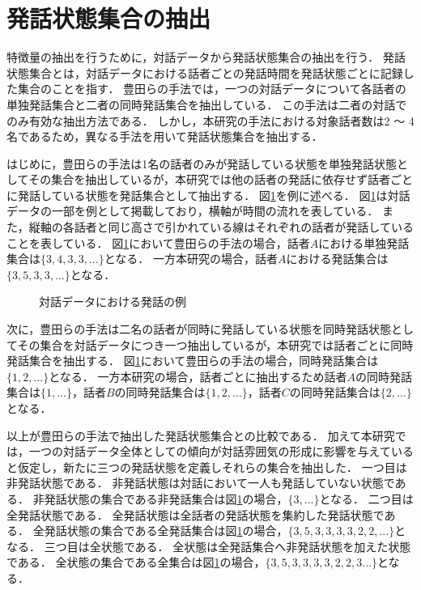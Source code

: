 \section{発話状態集合の抽出}

特徴量の抽出を行うために，対話データから発話状態集合の抽出を行う．
発話状態集合とは，対話データにおける話者ごとの発話時間を発話状態ごとに記録した集合のことを指す．
豊田らの手法では，一つの対話データについて各話者の単独発話集合と二者の同時発話集合を抽出している．
この手法は二者の対話でのみ有効な抽出方法である．
しかし，本研究の手法における対象話者数は2 〜 4名であるため，異なる手法を用いて発話状態集合を抽出する．

はじめに，豊田らの手法は1名の話者のみが発話している状態を単独発話状態としてその集合を抽出しているが，本研究では他の話者の発話に依存せず話者ごとに発話している状態を発話集合として抽出する．
図\ref{fig:speaker_split}を例に述べる．
図\ref{fig:speaker_split}は対話データの一部を例として掲載しており，横軸が時間の流れを表している．
また，縦軸の各話者と同じ高さで引かれている線はそれぞれの話者が発話していることを表している．
図\ref{fig:speaker_split}において豊田らの手法の場合，話者$A$における単独発話集合は$\{3, 4, 3, 3, ...\}$となる．
一方本研究の場合，話者$A$における発話集合は$\{3, 5, 3, 3, ...\}$となる．

\begin{figure}
    \centering
    \caption{対話データにおける発話の例}
    \label{fig:speaker_split}
\end{figure}

次に，豊田らの手法は二名の話者が同時に発話している状態を同時発話状態としてその集合を対話データにつき一つ抽出しているが，本研究では話者ごとに同時発話集合を抽出する．
図\ref{fig:speaker_split}において豊田らの手法の場合，同時発話集合は$\{1, 2, ...\}$となる．
一方本研究の場合，話者ごとに抽出するため話者$A$の同時発話集合は$\{1, ...\}$，話者$B$の同時発話集合は$\{1, 2, ...\}$，話者$C$の同時発話集合は$\{2, ...\}$となる．

以上が豊田らの手法で抽出した発話状態集合との比較である．
加えて本研究では，一つの対話データ全体としての傾向が対話雰囲気の形成に影響を与えていると仮定し，新たに三つの発話状態を定義しそれらの集合を抽出した．
一つ目は非発話状態である．
非発話状態は対話において一人も発話していない状態である．
非発話状態の集合である非発話集合は図\ref{fig:speaker_split}の場合，$\{3, ...\}$となる．
二つ目は全発話状態である．
全発話状態は全話者の発話状態を集約した発話状態である．
全発話状態の集合である全発話集合は図\ref{fig:speaker_split}の場合，$\{3, 5, 3, 3, 3, 3, 2, 2, ...\}$となる．
三つ目は全状態である．
全状態は全発話集合へ非発話状態を加えた状態である．
全状態の集合である全集合は図\ref{fig:speaker_split}の場合，$\{3, 5, 3, 3, 3, 3, 2, 2, 3 ...\}$となる．

